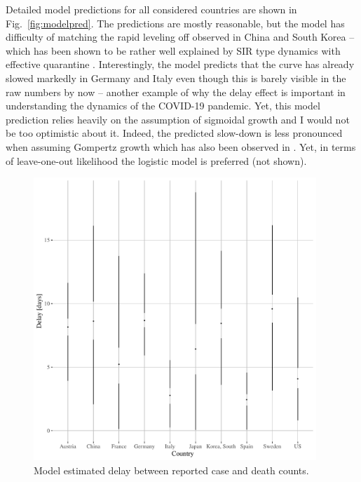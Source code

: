 \documentclass[a4paper]{tufte-handout}
\newcommand{\fig}[1]{Fig.~\ref{fig:#1}}
\begin{document}
Detailed model predictions for all considered countries are shown in
\fig{modelpred}. The predictions are mostly reasonable, but the model
has difficulty of matching the rapid leveling off observed in China
and South Korea -- which has been shown to be rather well explained by
SIR type dynamics with effective quarantine
\cite{arxiv:2002.07572}. Interestingly, the model predicts that the
curve has already slowed markedly in Germany and Italy even though
this is barely visible in the raw numbers by now -- another example of
why the delay effect is important in understanding the dynamics of the
COVID-19 pandemic. Yet, this model prediction relies heavily on the
assumption of sigmoidal growth and I would not be too optimistic about
it. Indeed, the predicted slow-down is less pronounced when assuming
Gompertz growth which has also been observed in
\cite{https://doi.org/10.1101/2020.03.12.20034595}. Yet, in terms of
leave-one-out likelihood the logistic model is preferred (not shown).

\begin{figure}
  \begin{center}
    \includegraphics[width=0.95\textwidth]{../figs/tau_die.pdf}
  \end{center}
  \caption{\label{fig:taudie} Model estimated delay between reported
    case and death counts.}
\end{figure}
\end{document}
